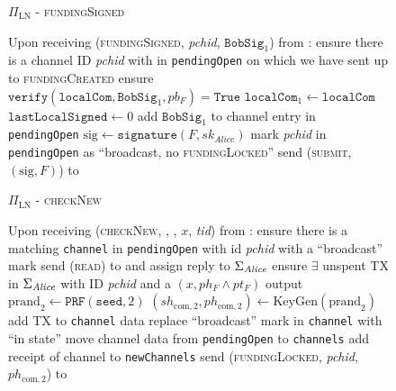 \begin{figure}[!htbp]
  \begin{protocolbox}{$\Pi_{\mathrm{LN}}$ - \textsc{fundingSigned}}
    \begin{algorithmic}[1]
      \State Upon receiving (\textsc{fundingSigned}, \textit{pchid},
      $\mathtt{BobSig}_1$) from \bob:
      \Indent
        \State ensure there is a channel ID \textit{pchid} with \bob{} in
        \texttt{pendingOpen} on which we have sent up to \textsc{fundingCreated}
        \State ensure $\mathtt{verify}\left(\mathtt{localCom},
        \mathtt{BobSig}_1, pb_F\right) = \mathtt{True}$
        \State $\mathtt{localCom}_1 \gets \mathtt{localCom}$
        \State $\mathtt{lastLocalSigned} \gets 0$
        \State add $\mathtt{BobSig}_1$ to channel entry in \texttt{pendingOpen}
        \State $\mathrm{sig} \gets \mathtt{signature}\left(F,
        sk_{\mathit{Alice}}\right)$
        \State mark \textit{pchid} in \texttt{pendingOpen} as ``broadcast, no
        \textsc{fundingLocked}''
        \State send (\textsc{submit}, $\left(\mathrm{sig}, F\right)$) to \ledger
      \EndIndent
    \end{algorithmic}
  \end{protocolbox}
  \caption{}
  \label{alg:protocol:open:fundingSigned}
\end{figure}

\begin{figure}[!htbp]
  \begin{protocolbox}{$\Pi_{\mathrm{LN}}$ - \textsc{checkNew}}
    \begin{algorithmic}[1]
      \State {}
      \State Upon receiving (\textsc{checkNew}, \alice, \bob, $x$, \textit{tid})
      from \environment: 
      \Indent
        \State ensure there is a matching \texttt{channel} in
        \texttt{pendingOpen} with id \textit{pchid} with a ``broadcast'' mark
        \State send (\textsc{read}) to \ledger{} and assign reply to
        $\Sigma_{\mathit{Alice}}$
        \State ensure $\exists$ unspent TX in $\Sigma_{\mathit{Alice}}$ with ID
        \textit{pchid} and a $\left(x, ph_F \wedge pt_F\right)$ output
        \State $\mathrm{prand}_2 \gets \texttt{PRF}\left(\mathtt{seed},
        2\right)$
        \State $\left(sh_{\mathrm{com}, 2}, ph_{\mathrm{com}, 2}\right) \gets
        \mathrm{KeyGen}\left(\mathrm{prand}_2\right)$
        \State add TX to \texttt{channel} data \State replace ``broadcast'' mark
        in \texttt{channel} with ``in state''
          \State move channel data from \texttt{pendingOpen} to
          \texttt{channels}
          \State add receipt of channel to \texttt{newChannels}
        \EndIf
        \State send (\textsc{fundingLocked}, \textit{pchid}, $ph_{\mathrm{com},
        2}$) to \bob{}
      \EndIndent
    \end{algorithmic}
  \end{protocolbox}
  \caption{}
  \label{alg:protocol:open:checkNew}
\end{figure}

